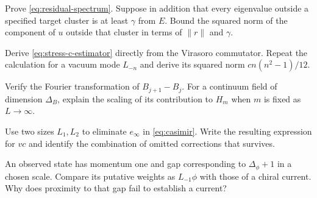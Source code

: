 \begin{exercise}\label{ex:scaling-residual}
Prove \eqref{eq:residual-spectrum}. Suppose in addition that every
eigenvalue outside a specified target cluster is at least $\gamma$
from $E$. Bound the squared norm of the component of $u$ outside that
cluster in terms of $\|r\|$ and $\gamma$.

\par\smallskip{}\par
\end{exercise}
\begin{exercise}\label{ex:scaling-stress}
Derive \eqref{eq:stress-c-estimator} directly from the Virasoro
commutator. Repeat the calculation for a vacuum mode $L_{-n}$ and
derive its squared norm $c n(n^2-1)/12$.

\par\smallskip{}\par
\end{exercise}
\begin{exercise}\label{ex:scaling-improvement}
Verify the Fourier transformation of $B_{j+1}-B_j$. For a continuum
field of dimension $\Delta_B$, explain the scaling of its contribution
to $H_m$ when $m$ is fixed as $L\to\infty$.

\par\smallskip{}\par
\end{exercise}
\begin{exercise}\label{ex:scaling-casimir}
Use two sizes $L_1,L_2$ to eliminate $e_\infty$ in
\eqref{eq:casimir}. Write the resulting expression for $vc$ and
identify the combination of omitted corrections that survives.

\par\smallskip{}\par
\end{exercise}
\begin{exercise}\label{ex:scaling-fraction}
An observed state has momentum one and gap corresponding to
$\Delta_\phi+1$ in a chosen scale. Compare its putative weights as
$L_{-1}\phi$ with those of a chiral current. Why does proximity to
that gap fail to establish a current?

\par\smallskip{}\par
\end{exercise}
